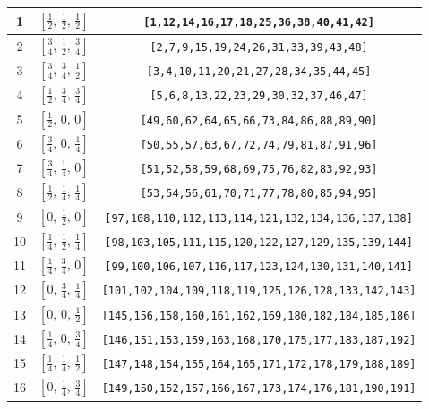 \documentclass[fleqn,8pt]{jsarticle}
\begin{document}
\begin{longtable}{ccc}
1 & $\left[ \frac{1}{2},\, \frac{1}{2},\, \frac{1}{2} \right]$ & {\tt [1,12,14,16,17,18,25,36,38,40,41,42]} \\ \hline
2 & $\left[ \frac{3}{4},\, \frac{1}{2},\, \frac{3}{4} \right]$ & {\tt [2,7,9,15,19,24,26,31,33,39,43,48]} \\ \hline
3 & $\left[ \frac{3}{4},\, \frac{3}{4},\, \frac{1}{2} \right]$ & {\tt [3,4,10,11,20,21,27,28,34,35,44,45]} \\ \hline
4 & $\left[ \frac{1}{2},\, \frac{3}{4},\, \frac{3}{4} \right]$ & {\tt [5,6,8,13,22,23,29,30,32,37,46,47]} \\ \hline
5 & $\left[ \frac{1}{2},\, 0,\, 0 \right]$ & {\tt [49,60,62,64,65,66,73,84,86,88,89,90]} \\ \hline
6 & $\left[ \frac{3}{4},\, 0,\, \frac{1}{4} \right]$ & {\tt [50,55,57,63,67,72,74,79,81,87,91,96]} \\ \hline
7 & $\left[ \frac{3}{4},\, \frac{1}{4},\, 0 \right]$ & {\tt [51,52,58,59,68,69,75,76,82,83,92,93]} \\ \hline
8 & $\left[ \frac{1}{2},\, \frac{1}{4},\, \frac{1}{4} \right]$ & {\tt [53,54,56,61,70,71,77,78,80,85,94,95]} \\ \hline
9 & $\left[ 0,\, \frac{1}{2},\, 0 \right]$ & {\tt [97,108,110,112,113,114,121,132,134,136,137,138]} \\ \hline
10 & $\left[ \frac{1}{4},\, \frac{1}{2},\, \frac{1}{4} \right]$ & {\tt [98,103,105,111,115,120,122,127,129,135,139,144]} \\ \hline
11 & $\left[ \frac{1}{4},\, \frac{3}{4},\, 0 \right]$ & {\tt [99,100,106,107,116,117,123,124,130,131,140,141]} \\ \hline
12 & $\left[ 0,\, \frac{3}{4},\, \frac{1}{4} \right]$ & {\tt [101,102,104,109,118,119,125,126,128,133,142,143]} \\ \hline
13 & $\left[ 0,\, 0,\, \frac{1}{2} \right]$ & {\tt [145,156,158,160,161,162,169,180,182,184,185,186]} \\ \hline
14 & $\left[ \frac{1}{4},\, 0,\, \frac{3}{4} \right]$ & {\tt [146,151,153,159,163,168,170,175,177,183,187,192]} \\ \hline
15 & $\left[ \frac{1}{4},\, \frac{1}{4},\, \frac{1}{2} \right]$ & {\tt [147,148,154,155,164,165,171,172,178,179,188,189]} \\ \hline
16 & $\left[ 0,\, \frac{1}{4},\, \frac{3}{4} \right]$ & {\tt [149,150,152,157,166,167,173,174,176,181,190,191]} \\
\end{longtable}
\renewcommand{\arraystretch}{1.2}
\end{document}
